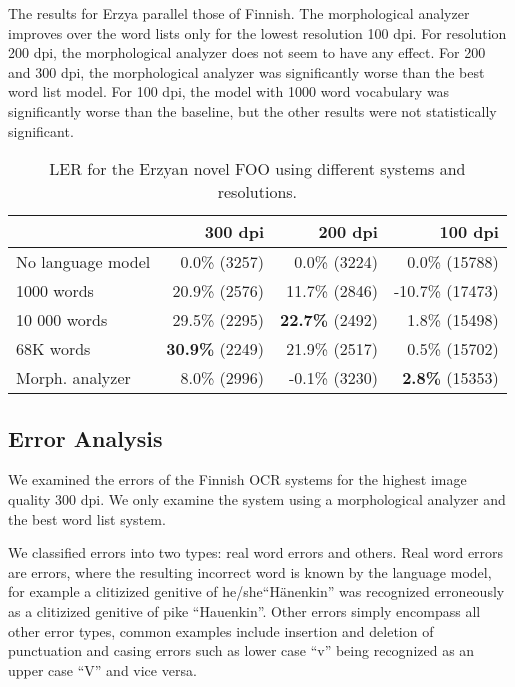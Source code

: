 \documentclass[b5paper]{article}
\begin{document}
The results for Erzya parallel those of Finnish. The morphological
analyzer improves over the word lists only for the lowest resolution
100 dpi. For resolution 200 dpi, the morphological analyzer does not
seem to have any effect. For 200 and 300 dpi, the morphological
analyzer was significantly worse than the best word list model. For
100 dpi, the model with 1000 word vocabulary was significantly worse
than the baseline, but the other results were not statistically
significant.

\begin{table}[!htb]
\begin{center}
\begin{tabular}{lrrr}
\hline 
                  & 300 dpi & 200 dpi & 100 dpi \\
\hline 
No language model &  0.0\% (3257)  &  0.0\% (3224)  &  0.0\% (15788)  \\
1000 words        &  20.9\% (2576)  &  11.7\% (2846)  & -10.7\%  (17473) \\
10 000 words      &  29.5\% (2295)  &   {\bf 22.7\%} (2492)  & 1.8\% (15498)  \\
68K words         &  {\bf 30.9\%} (2249)  &  21.9\% (2517)  & 0.5\% (15702)\\
Morph. analyzer   &  8.0\% (2996)  &  -0.1\% (3230)  & {\bf 2.8\%} (15353)  \\
\hline 
\end{tabular}
\caption{LER for the Erzyan novel FOO using different systems and resolutions.}\label{myv-novel-res}
\end{center}
\end{table}

\subsection{Error Analysis}

We examined the errors of the Finnish OCR systems for the highest
image quality 300 dpi. We only examine the system using a morphological
analyzer and the best word list system.

We classified errors into two types: real word errors and others. Real
word errors are errors, where the resulting incorrect word is known by
the language model, for example a clitizized genitive of
he/she``Hänenkin'' was recognized erroneously as a clitizized genitive
of pike ``Hauenkin''. Other errors simply encompass all other error
types, common examples include insertion and deletion of punctuation
and casing errors such as lower case ``v'' being recognized as an
upper case ``V'' and vice versa.
\end{document}
